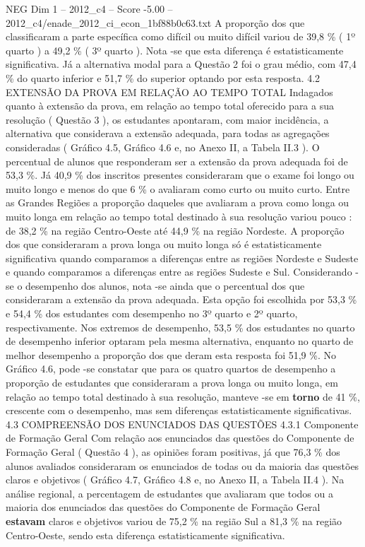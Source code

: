 \begin{textsample}{NEG Dim 1 – 2012\_c4 – Score -5.00 – 2012\_c4/enade\_2012\_ci\_econ\_1bf88b0c63.txt}
A proporção dos que classificaram a parte específica como difícil ou muito difícil variou de 39,8 \% ( 1º quarto ) a 49,2 \% ( 3º quarto ).
Nota -se que esta diferença é estatisticamente significativa.
Já a alternativa modal para a Questão 2 foi o grau médio, com 47,4 \% do quarto inferior e 51,7 \% do superior optando por esta resposta. 4.2 EXTENSÃO DA PROVA EM RELAÇÃO AO TEMPO TOTAL Indagados quanto à extensão da prova, em relação ao tempo total oferecido para a sua resolução ( Questão 3 ), os estudantes apontaram, com maior incidência, a alternativa que considerava a extensão adequada, para todas as agregações consideradas ( Gráfico 4.5, Gráfico 4.6 e, no Anexo II, a Tabela II.3 ).
O percentual de alunos que responderam ser a extensão da prova adequada foi de 53,3 \%.
Já 40,9 \% dos inscritos presentes consideraram que o exame foi longo ou muito longo e menos do que 6 \% o avaliaram como curto ou muito curto.
Entre as Grandes Regiões a proporção daqueles que avaliaram a prova como longa ou muito longa em relação ao tempo total destinado à sua resolução variou pouco : de 38,2 \% na região Centro-Oeste até 44,9 \% na região Nordeste.
A proporção dos que consideraram a prova longa ou muito longa só é estatisticamente significativa quando comparamos a diferenças entre as regiões Nordeste e Sudeste e quando comparamos a diferenças entre as regiões Sudeste e Sul.
Considerando -se o desempenho dos alunos, nota -se ainda que o percentual dos que consideraram a extensão da prova adequada.
Esta opção foi escolhida por 53,3 \% e 54,4 \% dos estudantes com desempenho no 3º quarto e 2º quarto, respectivamente.
Nos extremos de desempenho, 53,5 \% dos estudantes no quarto de desempenho inferior optaram pela mesma alternativa, enquanto no quarto de melhor desempenho a proporção dos que deram esta resposta foi 51,9 \%.
No Gráfico 4.6, pode -se constatar que para os quatro quartos de desempenho a proporção de estudantes que consideraram a prova longa ou muito longa, em relação ao tempo total destinado à sua resolução, manteve -se em \textbf{torno} de 41 \%, crescente com o desempenho, mas sem diferenças estatisticamente significativas. 4.3 COMPREENSÃO DOS ENUNCIADOS DAS QUESTÕES 4.3.1 Componente de Formação Geral Com relação aos enunciados das questões do Componente de Formação Geral ( Questão 4 ), as opiniões foram positivas, já que 76,3 \% dos alunos avaliados consideraram os enunciados de todas ou da maioria das questões claros e objetivos ( Gráfico 4.7, Gráfico 4.8 e, no Anexo II, a Tabela II.4 ).
Na análise regional, a percentagem de estudantes que avaliaram que todos ou a maioria dos enunciados das questões do Componente de Formação Geral \textbf{estavam} claros e objetivos variou de 75,2 \% na região Sul a 81,3 \% na região Centro-Oeste, sendo esta diferença estatisticamente significativa.

\end{textsample}
